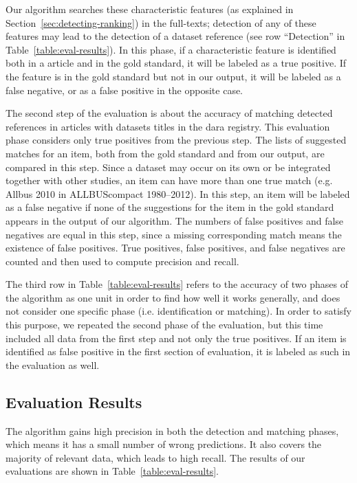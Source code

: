 \documentclass{IOS-Book-Article}
\newcommand{\dara}{\textsf{da\textbar ra}}
\begin{document}
Our algorithm searches these characteristic features (as explained in Section~\ref{sec:detecting-ranking}) in the full-texts; detection of any of these features may lead to the detection of a dataset reference (see row \enquote{Detection} in Table~\ref{table:eval-results}).
In this phase, if a characteristic feature is identified both in a article and in the gold standard, it will be labeled as a true positive.
If the feature is in the gold standard but not in our output, it will be labeled as a false negative, or as a false positive in the opposite case.
 
The second step of the evaluation is about the accuracy of matching detected references in articles with datasets titles in the {\dara} registry.
This evaluation phase considers only true positives from the previous step.
The lists of suggested matches for an item, both from the gold standard and from our output, are compared in this step. 
Since a dataset may occur on its own or be integrated together with other studies,
an item can have more than one true match (e.g. Allbus 2010 in ALLBUScompact 1980--2012).
In this step, an item will be labeled as a false negative if none of the suggestions for the item in the gold standard appears in the output of our algorithm.
The numbers of false positives and false negatives are equal in this step, since a missing corresponding match means the %
existence of false positives.
True positives, false positives, and false negatives are counted and then used to compute precision and recall.

The third row in Table~\ref{table:eval-results} refers to the accuracy of two phases of the algorithm as one unit in order to find how well it works generally, and does not consider one specific 
phase (i.e. identification or matching).
In order to satisfy this purpose, we repeated the second phase of the evaluation, but this time included all data from the first step and not only the true positives.
If an item is identified as false positive in the first section of evaluation, it is labeled as such in the evaluation as well.   
 
\subsection{Evaluation Results}
\label{sec:evre}
The algorithm gains high precision in both the detection and matching phases, which means it has a
small number of wrong predictions.
It also covers the majority of relevant data, which leads to high recall.
The results of our evaluations are shown in Table~\ref{table:eval-results}.
 
\end{document}
